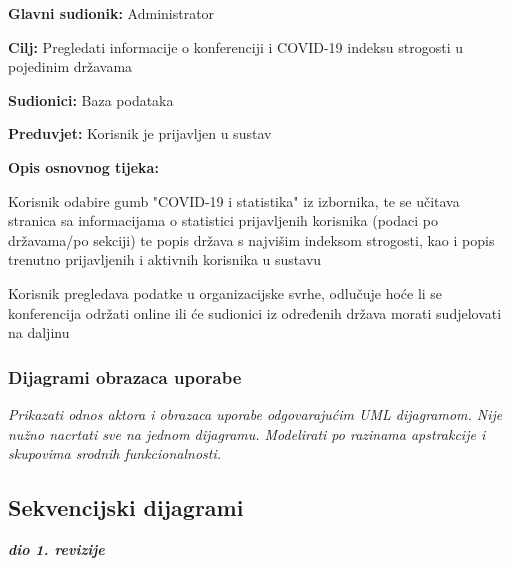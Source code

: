 					\noindent {}
					\begin{packed_item}
	
						\item \textbf{Glavni sudionik: } Administrator
						\item  \textbf{Cilj:} Pregledati informacije o konferenciji i COVID-19 indeksu strogosti u pojedinim državama
						\item  \textbf{Sudionici:} Baza podataka
						\item  \textbf{Preduvjet:} Korisnik je prijavljen u sustav
						\item  \textbf{Opis osnovnog tijeka:}
						
						\item[] \begin{packed_enum}
	
							\item Korisnik odabire gumb "COVID-19 i statistika" iz izbornika, te se učitava stranica sa informacijama o statistici prijavljenih korisnika (podaci po državama/po sekciji) te popis država s najvišim indeksom strogosti, kao i popis trenutno prijavljenih i aktivnih korisnika u sustavu
							\item Korisnik pregledava podatke u organizacijske svrhe, odlučuje hoće li se konferencija održati online ili će sudionici iz određenih država morati sudjelovati na daljinu

					
						\end{packed_enum}
			
					\end{packed_item}
					
					
				
					
				\subsubsection{Dijagrami obrazaca uporabe}
					
					\textit{Prikazati odnos aktora i obrazaca uporabe odgovarajućim UML dijagramom. Nije nužno nacrtati sve na jednom dijagramu. Modelirati po razinama apstrakcije i skupovima srodnih funkcionalnosti.}
				\eject		
				
			\subsection{Sekvencijski dijagrami}
				
				\textbf{\textit{dio 1. revizije}}\\
				
